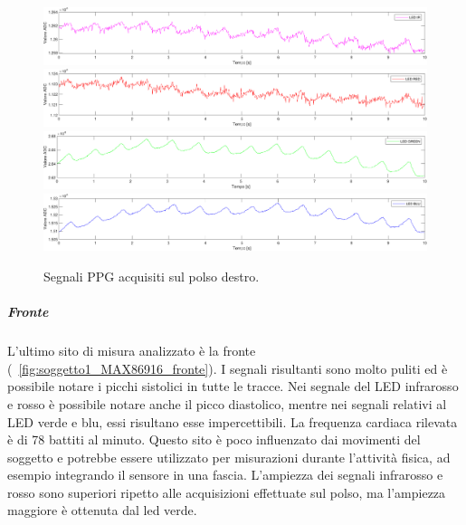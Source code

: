 \begin{figure}[h]
	\centering
	\includegraphics[width=1\linewidth]{ImageFiles/Misure Preliminari/Soggetto 1/MAX86916/polso_ired}
	\includegraphics[width=1\linewidth]{ImageFiles/Misure Preliminari/Soggetto 1/MAX86916/polso_red}
	\includegraphics[width=1\linewidth]{ImageFiles/Misure Preliminari/Soggetto 1/MAX86916/polso_green}
	\includegraphics[width=1\linewidth]{ImageFiles/Misure Preliminari/Soggetto 1/MAX86916/polso_blu}
	\caption{Segnali PPG acquisiti sul polso destro.}
	\label{fig:soggetto1_MAX86916_polso}
\end{figure}

\clearpage

\subparagraph{Fronte}

L'ultimo sito di misura analizzato è la fronte (\Fig~\ref{fig:soggetto1_MAX86916_fronte}). I segnali risultanti sono molto puliti ed è possibile notare i picchi sistolici in tutte le tracce. Nei segnale del LED infrarosso e rosso è possibile notare anche il picco diastolico, mentre nei segnali relativi al LED verde e blu, essi risultano esse impercettibili. La frequenza cardiaca rilevata è di 78 battiti al minuto. Questo sito è poco influenzato dai movimenti del soggetto e potrebbe essere utilizzato per misurazioni durante l'attività fisica, ad esempio integrando il sensore in una fascia. L'ampiezza dei segnali infrarosso e rosso sono superiori ripetto alle acquisizioni effettuate sul polso, ma l'ampiezza maggiore è ottenuta dal led verde.


